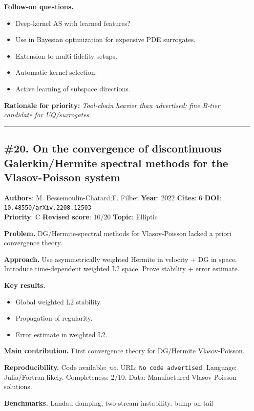 \documentclass[10pt,letterpaper]{article}
\begin{document}
\textbf{Follow-on questions.}
\begin{itemize}
\item Deep-kernel AS with learned features?
\item Use in Bayesian optimization for expensive PDE surrogates.
\item Extension to multi-fidelity setups.
\item Automatic kernel selection.
\item Active learning of subspace directions.
\end{itemize}

\textbf{Rationale for priority:} \emph{Tool-chain heavier than advertised; fine B-tier candidate for UQ/surrogates.}

\medskip\hrule\medskip

\subsection*{\#20. On the convergence of discontinuous Galerkin/Hermite spectral methods for the Vlasov-Poisson system}
\textbf{Authors}: M. Bessemoulin-Chatard;F. Filbet \textbullet{} \textbf{Year}: 2022 \textbullet{} \textbf{Cites}: 6 \textbullet{} \textbf{DOI}: \texttt{10.48550/arXiv.2208.12503} \\
\textbf{Priority}: C \textbullet{} \textbf{Revised score}: 10/20 \textbullet{} \textbf{Topic}: Elliptic

\textbf{Problem.} DG/Hermite-spectral methods for Vlasov-Poisson lacked a priori convergence theory.

\textbf{Approach.} Use asymmetrically weighted Hermite in velocity + DG in space. Introduce time-dependent weighted L2 space. Prove stability + error estimate.

\textbf{Key results.}
\begin{itemize}
\item Global weighted L2 stability.
\item Propagation of regularity.
\item Error estimate in weighted L2.
\end{itemize}

\textbf{Main contribution.} First convergence theory for DG/Hermite Vlasov-Poisson.

\textbf{Reproducibility.} Code available: \emph{no}. URL: \texttt{No code advertised}. Language: Julia/Fortran likely. Completeness: 2/10. Data: Manufactured Vlasov-Poisson solutions.

\textbf{Benchmarks.} Landau damping, two-stream instability, bump-on-tail
\end{document}

